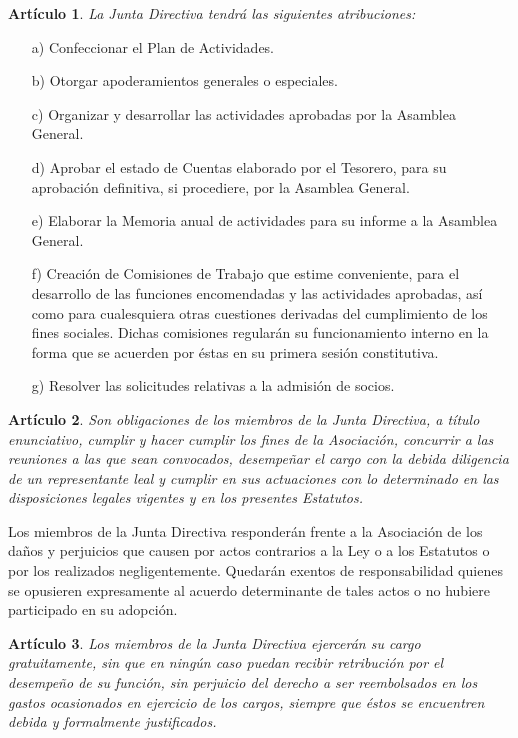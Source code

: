\documentclass[a4paper,12pt]{article}
\theoremstyle{mystyle}		%
\newtheorem{art}{Artículo}	%
\begin{document}
\begin{onehalfspace}
\begin{art}
La Junta Directiva tendrá las siguientes atribuciones:
\end{art}
\begin{itemize}
\item [a)] Confeccionar el Plan de Actividades.
\item [b)] Otorgar apoderamientos generales o especiales.
\item [c)] Organizar y desarrollar las actividades aprobadas por la Asamblea General.
\item [d)] Aprobar el estado de Cuentas elaborado por el Tesorero, para su aprobación definitiva, si procediere, por la Asamblea General.
\item [e)] Elaborar la Memoria anual de actividades para su informe a la Asamblea General.
\item [f)] Creación de Comisiones de Trabajo que estime conveniente, para el desarrollo de las funciones encomendadas y las actividades aprobadas, así como para cualesquiera otras cuestiones derivadas del cumplimiento de los fines sociales. Dichas comisiones regularán su funcionamiento interno en la forma que se acuerden por éstas en su primera sesión constitutiva.
\item [g)] Resolver las solicitudes relativas a la admisión de socios.
\end{itemize}

\begin{art}
Son obligaciones de los miembros de la Junta Directiva, a título enunciativo, cumplir y hacer cumplir los fines de la Asociación, concurrir a las reuniones a las que sean convocados, desempeñar el cargo con la debida diligencia de un representante leal y cumplir en sus actuaciones con lo determinado en las disposiciones legales vigentes y en los presentes Estatutos.
\end{art}

Los miembros de la Junta Directiva responderán frente a la Asociación de los daños y perjuicios que causen por actos contrarios a la Ley o a los Estatutos o por los realizados negligentemente. Quedarán exentos de responsabilidad quienes se opusieren expresamente al acuerdo determinante de tales actos o no hubiere participado en su adopción.

\begin{art}
Los miembros de la Junta Directiva ejercerán su cargo gratuitamente, sin que en ningún caso puedan recibir retribución por el desempeño de su función, sin perjuicio del derecho a ser reembolsados en los gastos ocasionados en ejercicio de los cargos, siempre que éstos se encuentren debida y formalmente justificados.
\end{art}


\end{onehalfspace}
\end{document}
